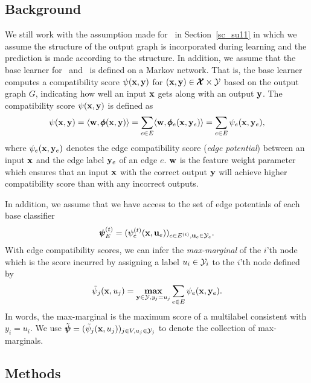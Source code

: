 {%
%
\subsection{Background}

We still work with the assumption made for \mve\ in Section~\ref{sc_su11} in which we assume the structure of the output graph is incorporated during learning and the prediction is made according to the structure.
In addition, we assume that the base learner for \amm\ and \mam\ is defined on a Markov network.
That is, the base learner computes a compatibility score $\psi(\mathbf {x},\mathbf {y})$ for $(\mathbf {x},\mathbf {y})\in\pmb {\mathcal{X}}\times\mathcal{Y}$ based on the output graph $G$, indicating how well an input $\mathbf {x}$ gets along with an output $\mathbf {y}$.
The compatibility score $\psi(\mathbf {x},\mathbf {y})$ is defined as
\begin{align*}
	\psi(\mathbf {x},\mathbf {y}) = \langle \mathbf {w}, \pmb \phi(\mathbf {x},\mathbf {y}) \rangle = \sum_{e\in E}\langle \mathbf {w}, \pmb \phi_e(\mathbf {x},\mathbf {y}_e) \rangle=\sum_{e\in E}\psi_e(\mathbf {x},\mathbf {y}_e),
\end{align*}
where $\psi_e(\mathbf {x},\mathbf {y}_e)$ denotes the edge compatibility score (\textit{edge potential}) between an input $\mathbf {x}$ and the edge label $\mathbf {y}_e$ of an edge $e$.
$\mathbf {w}$ is the feature weight parameter which ensures that an input $\mathbf {x}$ with the correct output $\mathbf {y}$ will achieve higher compatibility score than with any incorrect outputs.

In addition, we assume that we have access to the set of edge potentials of each base classifier 
\begin{align*}
	\pmb \psi_E^{(t)} = (\psi_e^{(t)}(\mathbf {x},\mathbf {u}_e))_{e\in E^{(t)},\mathbf {u}_e\in\mathcal{Y}_e}.
\end{align*}
With edge compatibility scores, we can infer the \textit{max-marginal} \citep{Wainwright05map} of the $i$'th node which is the score incurred by assigning a label $u_i\in\mathcal{Y}_i$ to the $i$'th node defined by
\begin{align*}
	\tilde{\psi}_j(\mathbf {x},u_j) = \underset{\mathbf {y}\in\mathcal{Y},y_j=u_j}{\textbf{max}}\sum_{e\in E}\psi_e(\mathbf {x},\mathbf {y}_e).
\end{align*}
In words, the max-marginal is the maximum score of a multilabel consistent with $y_i=u_i$.
We use $\tilde{\pmb \psi} = (\tilde{\psi}_j(\mathbf {x},u_j))_{j\in V,u_j\in\mathcal{Y}_j}$ to denote the collection of max-marginals.

\subsection{Methods}

}
